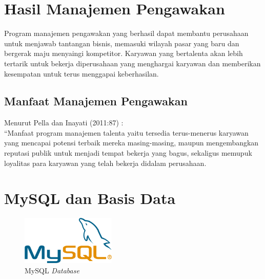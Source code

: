 \section{Hasil Manajemen Pengawakan}

Program manajemen pengawakan yang berhasil dapat membantu perusahaan untuk menjawab tantangan bisnis, memasuki wilayah pasar yang baru dan bergerak maju menyaingi kompetitor. Karyawan yang bertalenta akan lebih tertarik untuk bekerja diperusahaan yang menghargai karyawan dan memberikan kesempatan untuk terus menggapai keberhasilan.

\subsection{Manfaat Manajemen Pengawakan}

Menurut Pella dan Inayati (2011:87) \cite{4} : \\
“Manfaat program manajemen talenta yaitu tersedia terus-menerus karyawan yang mencapai potensi terbaik mereka masing-masing, maupun mengembangkan reputasi publik untuk menjadi tempat bekerja yang bagus, sekaligus memupuk loyalitas para karyawan yang telah bekerja didalam perusahaan.

\newpage

\section{MySQL dan Basis Data}

\begin{figure}
	\centering
	\includegraphics[width=0.4\textwidth]
	{pics/mysql.png}
	\caption{MySQL \textit{Database}}
	\label{fig:31}
\end{figure}

